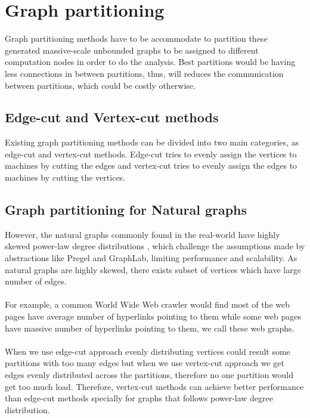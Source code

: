 \documentclass[12pt]{report}
\numberwithin{figure}{section}
\numberwithin{table}{section}
\begin{document}
\section{Graph partitioning}
Graph partitioning methods have to be accommodate to partition these generated massive-scale unbounded graphs to be assigned to  different computation nodes in order to do the analysis. Best partitions would be having less connections in between partitions, thus, will reduces the communication between partitions, which could be costly otherwise.

\subsection{Edge-cut and Vertex-cut methods}
Existing graph partitioning methods can be divided into two main categories, as edge-cut and vertex-cut methods\cite{S-PowerGraph}. Edge-cut tries to evenly assign the vertices to machines by cutting the edges and vertex-cut tries to evenly assign the edges to machines by cutting the vertices.
 
\subsection{Graph partitioning for Natural graphs}
However, the natural graphs commonly found in the real-world have highly skewed power-law degree distributions \cite{powerLaw1} \cite{powerLaw2}, which challenge the assumptions made by abstractions like  Pregel\cite{Pregel} and GraphLab\cite{Graphlab}, limiting performance and scalability. As natural graphs are highly skewed, there exists subset of vertices which have large number of edges. 

\paragraph{}

For example, a common World Wide Web crawler would find most of the web pages have average number of hyperlinks pointing to them while some web pages have massive number of hyperlinks pointing to them, we call these web graphs\cite{WebGraphs}. 

\paragraph{}

When we use edge-cut approach evenly distributing vertices could result some partitions with too many edges but when we use vertex-cut approach we get edges evenly distributed across the partitions, therefore no one partition would get too much load. Therefore, vertex-cut methods can achieve better performance than edge-cut methods\cite{PowerGraph} specially for graphs that follows power-law degree distribution.
\end{document}
